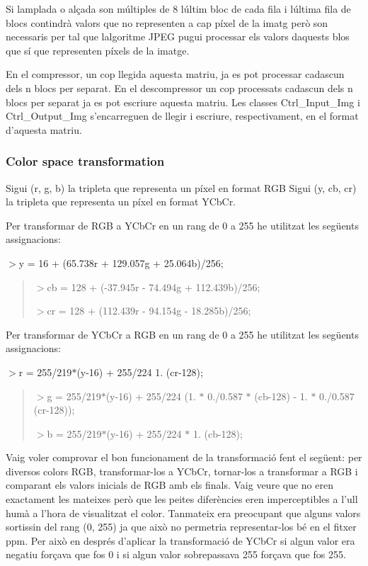 Si l\textquotesingle{}amplada o alçada son múltiples de 8 l\textquotesingle{}últim bloc de cada fila i l\textquotesingle{}última fila de blocs contindrà valors que no representen a cap píxel de la imatg però son necessaris per tal que l\textquotesingle{}algoritme J\+P\+EG pugui processar els valors d\textquotesingle{}aquests blos que sí que representen píxels de la imatge.

En el compressor, un cop llegida aquesta matriu, ja es pot processar cadascun dels n blocs per separat. En el descompressor un cop processats cadascun dels n blocs per separat ja es pot escriure aquesta matriu. Les classes Ctrl\+\_\+\+Input\+\_\+\+Img i Ctrl\+\_\+\+Output\+\_\+\+Img s’encarreguen de llegir i escriure, respectivament, en el format d’aquesta matriu.

\subsubsection*{Color space transformation}

Sigui (r, g, b) la tripleta que representa un píxel en format R\+GB Sigui (y, cb, cr) la tripleta que representa un píxel en format Y\+Cb\+Cr.

Per transformar de R\+GB a Y\+Cb\+Cr en un rang de 0 a 255 he utilitzat les següents assignacions\+:

$>$y = 16 + (65.\+738r + 129.\+057g + 25.\+064b)/256; \begin{quote}


$>$cb = 128 + (-\/37.\+945r -\/ 74.\+494g + 112.\+439b)/256;

$>$cr = 128 + (112.\+439r -\/ 94.\+154g -\/ 18.\+285b)/256; \end{quote}


Per transformar de Y\+Cb\+Cr a R\+GB en un rang de 0 a 255 he utilitzat les següents assignacions\+:

$>$r = 255/219$\ast$(y-\/16) + 255/224 1. (cr-\/128); \begin{quote}


$>$g = 255/219$\ast$(y-\/16) + 255/224 (1. $\ast$ 0./0.587 $\ast$ (cb-\/128) -\/ 1. $\ast$ 0./0.587 (cr-\/128));

$>$b = 255/219$\ast$(y-\/16) + 255/224 $\ast$ 1. (cb-\/128); \end{quote}


Vaig voler comprovar el bon funcionament de la transformació fent el següent\+: per diversos colors R\+GB, transformar-\/los a Y\+Cb\+Cr, tornar-\/los a transformar a R\+GB i comparant els valors inicials de R\+GB amb els finals. Vaig veure que no eren exactament les mateixes però que les peites diferències eren imperceptibles a l’ull humà a l’hora de visualitzat el color. Tanmateix era preocupant que alguns valors sortissin del rang (0, 255) ja que això no permetria representar-\/los bé en el fitxer ppm. Per això en després d’aplicar la transformació de Y\+Cb\+Cr si algun valor era negatiu forçava que fos 0 i si algun valor sobrepassava 255 forçava que fos 255.

